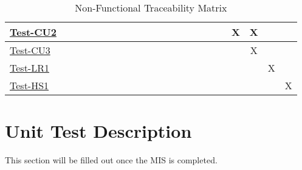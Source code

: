 \documentclass[12pt, titlepage]{article}
\begin{document}
\begin{landscape}
\begin{table}[H]
\begin{adjustwidth}{-0.3in}{-0.5in}
{\begin{tabular}{c|c|c|c|c|c|c|c|c|c|c|c|c|c|c|c|c|c|c|c|c|c|}
\multicolumn{1}{|l|}{\hyperref[itm:Test-CU2]{Test-CU2}}   &             &             &             &             &             &              &             &             &              &              &              &             &              &             &             &         &&X&X&&     \\ \hline
\multicolumn{1}{|l|}{\hyperref[itm:Test-CU3]{Test-CU3}}   &             &             &             &             &             &              &             &             &              &              &              &             &              &             &             &         &&&X&&     \\ \hline
\multicolumn{1}{|l|}{\hyperref[itm:Test-LR1]{Test-LR1}}   &             &             &             &             &             &              &             &             &              &              &              &             &              &             &             &         &&&&X&     \\ \hline
\multicolumn{1}{|l|}{\hyperref[itm:Test-HS1]{Test-HS1}}   &             &             &             &             &             &              &             &             &              &              &              &             &              &             &             &         &&&&& X    \\ \hline


\end{tabular}

}
\caption{Non-Functional Traceability Matrix}
    \label{tab:matrix3}
\end{adjustwidth}
\end{table}
\end{landscape}

\section{Unit Test Description}
This section will be filled out once the MIS is completed. 


\end{document}
